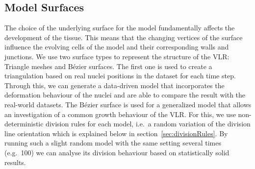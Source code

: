 \documentclass[11pt,a4paper, final]{article}
\begin{document}
\subsection{Model Surfaces}
\noindent
The choice of the underlying surface for the model fundamentally affects the development of the tissue. This means that the changing vertices of the surface influence the evolving cells of the model and their corresponding walls and junctions. We use two surface types to represent the structure of the VLR: Triangle meshes and B\'ezier surfaces. The first one is used to create a triangulation based on real nuclei positions in the dataset for each time step. Through this, we can generate a data-driven model that incorporates the deformation behaviour of the nuclei and are able to compare the result with the real-world datasets. The B\'ezier surface is used for a generalized model that allows an investigation of a common growth behaviour of the VLR. For this, we use non-deterministic division rules for each model, i.e.\ a random variation of the division line orientation which is explained below in section~\ref{sec:divisionRules}. By running such a slight random model with the same setting several times (e.g.\ 100) we can analyse its division behaviour based on statistically solid results.
\end{document}
